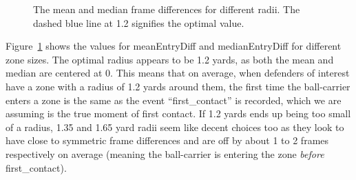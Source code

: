 \documentclass[
  12pt]{article}
\begin{document}
\begin{figure}


\caption{\label{fig-frameDiffs}The mean and median frame differences for
different radii. The dashed blue line at 1.2 signifies the optimal
value.}

\end{figure}%

Figure~\ref{fig-frameDiffs} shows the values for meanEntryDiff and
medianEntryDiff for different zone sizes. The optimal radius appears to
be 1.2 yards, as both the mean and median are centered at 0. This means
that on average, when defenders of interest have a zone with a radius of
1.2 yards around them, the first time the ball-carrier enters a zone is
the same as the event ``first\_contact'' is recorded, which we are
assuming is the true moment of first contact. If 1.2 yards ends up being
too small of a radius, 1.35 and 1.65 yard radii seem like decent choices
too as they look to have close to symmetric frame differences and are
off by about 1 to 2 frames respectively on average (meaning the
ball-carrier is entering the zone \emph{before} first\_contact).
\end{document}
